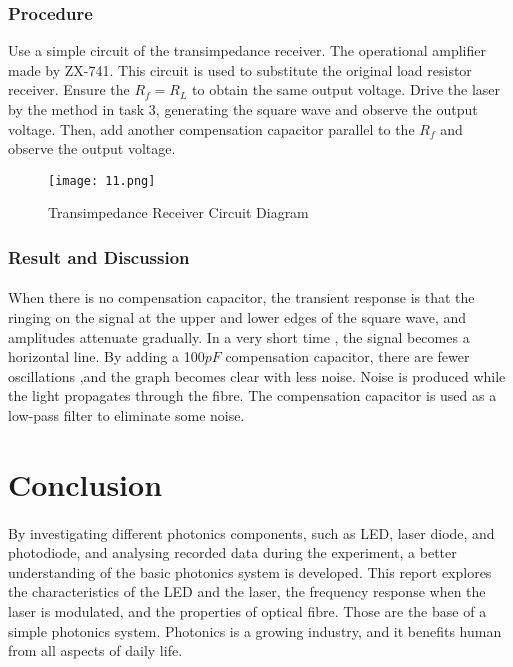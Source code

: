 \documentclass[12pt]{article}
\begin{document}
    \subsubsection{Procedure}
     Use a simple circuit of the transimpedance receiver. The operational amplifier made by ZX-741. This circuit is used to substitute the original load resistor receiver. Ensure the $R_{f}=R_{L}$ to obtain the same output voltage. Drive the laser by the method in task 3, generating the square wave and observe the output voltage. Then, add another compensation capacitor parallel to the $R_{f}$ and observe the output voltage.
     \begin{figure}[H]
    \centering
    \texttt{[image: 11.png]}
    \caption{Transimpedance Receiver Circuit Diagram}
    \end{figure}
    
    
    \subsubsection{Result and Discussion}
    \paragraph{}
    When there is no compensation capacitor, the transient response is that the ringing on the signal at the upper and lower edges of the square wave, and amplitudes attenuate gradually. In a very short time , the signal becomes a horizontal line. By adding a 100$pF$ compensation capacitor, there are fewer oscillations ,and the graph becomes clear with less noise. Noise is produced while the light propagates through the fibre. The compensation capacitor is used as a low-pass filter to eliminate some noise.
    
    
  
    
    \section{Conclusion}
    \paragraph{}
     By investigating different photonics components, such as LED, laser diode, and photodiode, and analysing recorded data during the experiment, a better understanding of the basic photonics system is developed. This report explores the characteristics of the LED and the laser, the frequency response when the laser is modulated, and the properties of optical fibre. Those are the base of a simple photonics system. Photonics is a growing industry, and it benefits human from all aspects of daily life.
    
\end{document}
